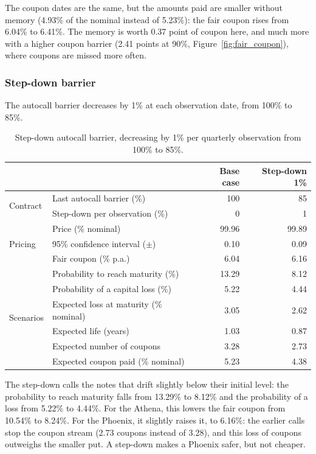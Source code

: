 \documentclass[11pt,a4paper]{article}
\begin{document}
The coupon dates are the same, but the amounts paid are smaller without memory (4.93\% of the nominal instead of
5.23\%): the fair coupon rises from 6.04\% to 6.41\%. The memory is worth 0.37 point of coupon here, and much more
with a higher coupon barrier (2.41 points at 90\%, Figure~\ref{fig:fair_coupon}), where coupons are missed more
often.

\clearpage
\subsubsection{Step-down barrier}

The autocall barrier decreases by 1\% at each observation date, from 100\% to 85\%.

\begin{table}[htbp]
  \centering
  \small
  \begin{tabular}{llrr}
    \toprule
     & & \textbf{Base case} & \textbf{Step-down 1\%} \\
    \midrule
    \multirow{2}{*}{Contract}
      & Last autocall barrier (\%) & 100 & 85 \\
      & Step-down per observation (\%) & 0 & 1 \\
    \midrule
    \multirow{3}{*}{Pricing}
      & Price (\% nominal) & 99.96 & 99.89 \\
      & 95\% confidence interval ($\pm$) & 0.10 & 0.09 \\
      & Fair coupon (\% p.a.) & 6.04 & 6.16 \\
    \midrule
    \multirow{6}{*}{Scenarios}
      & Probability to reach maturity (\%) & 13.29 & 8.12 \\
      & Probability of a capital loss (\%) & 5.22 & 4.44 \\
      & Expected loss at maturity (\% nominal) & 3.05 & 2.62 \\
      & Expected life (years) & 1.03 & 0.87 \\
      & Expected number of coupons & 3.28 & 2.73 \\
      & Expected coupon paid (\% nominal) & 5.23 & 4.38 \\
    \bottomrule
  \end{tabular}
  \caption{Step-down autocall barrier, decreasing by 1\% per quarterly observation from 100\% to 85\%.}
  \label{tab:phoenix-step-down}
\end{table}

The step-down calls the notes that drift slightly below their initial level: the probability to reach maturity falls
from 13.29\% to 8.12\% and the probability of a loss from 5.22\% to 4.44\%. For the Athena, this lowers the fair coupon
from 10.54\% to 8.24\%. For the Phoenix, it slightly raises it, to 6.16\%: the earlier calls stop the coupon stream
(2.73 coupons instead of 3.28), and this loss of coupons outweighs the smaller put. A step-down makes a Phoenix safer,
but not cheaper.
\end{document}
